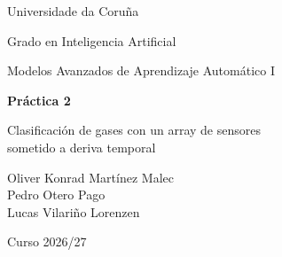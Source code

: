 \documentclass[11pt,a4paper]{article}
\begin{document}
\begin{titlepage}
\centering
{\large Universidade da Coruña\par}
{\large Grado en Inteligencia Artificial\par}
\vspace{1cm}
{\Large Modelos Avanzados de Aprendizaje Automático I\par}
\vspace{2cm}
{\huge\bfseries Práctica 2\par}
\vspace{0.5cm}
{\LARGE Clasificación de gases con un array de sensores\\ sometido a deriva temporal\par}
\vfill
{\large
Oliver Konrad Martínez Malec\\
Pedro Otero Pago\\
Lucas Vilariño Lorenzen\par}
\vspace{1cm}
{\large Curso 2026/27\par}
\end{titlepage}

\tableofcontents
\newpage


\appendix
\end{document}

